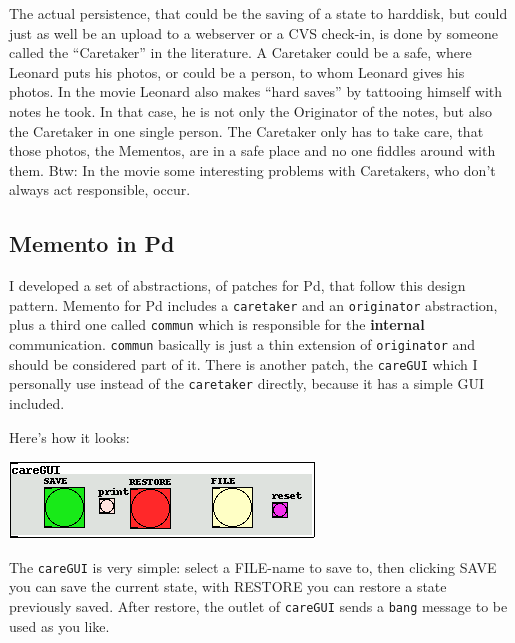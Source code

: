 \documentclass[10pt,english]{scrartcl}
\begin{document}
The actual persistence, that could be the saving of a state to harddisk,
but could just as well be an upload to a webserver or a CVS check-in, is
done by someone called the ``Caretaker'' in the literature. A Caretaker could
be a safe, where Leonard puts his photos, or could be a person, to whom
Leonard gives his photos. In the movie Leonard also makes ``hard saves'' by
tattooing himself with notes he took. In that case, he is not only the
Originator of the notes, but also the Caretaker in one single person.  The
Caretaker only has to take care, that those photos, the Mementos, are in a
safe place and no one fiddles around with them. Btw: In the movie some
interesting problems with Caretakers, who don't always act responsible,
occur.



\hypertarget{memento-in-pd}{}
\subsection*{Memento in Pd}

I developed a set of abstractions, of patches for Pd, that follow this
design pattern. Memento for Pd includes a \texttt{caretaker} and an
\texttt{originator} abstraction, plus a third one called \texttt{commun} which is
responsible for the \textbf{internal} communication. \texttt{commun} basically is
just a thin extension of \texttt{originator} and should be considered part of
it.  There is another patch, the \texttt{careGUI} which I personally use instead
of the \texttt{caretaker} directly, because it has a simple GUI included.

Here's how it looks:

\includegraphics{caregui.png}

The \texttt{careGUI} is very simple: select a FILE-name to save to, then
clicking SAVE you can save the current state, with RESTORE you can restore
a state previously saved. After restore, the outlet of \texttt{careGUI} sends a
\texttt{bang} message to be used as you like.
\end{document}
